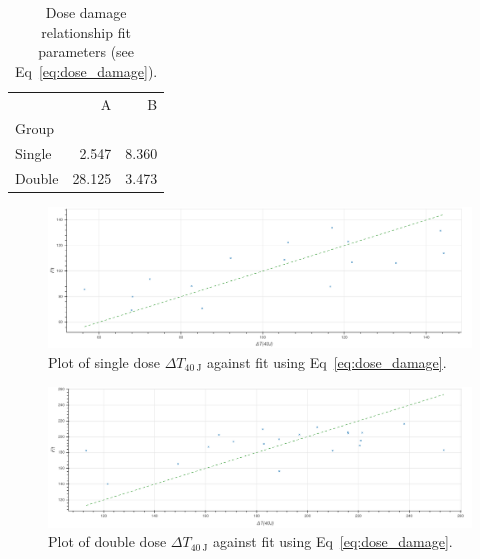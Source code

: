 \documentclass{article}
\begin{document}
    \begin{table}
    \centering
    \caption{Dose damage relationship fit parameters (see Eq~\ref{eq:dose_damage}).}
    \label{table:fit_params_dose}
    
    \begin{tabular}{lrr}
        \toprule
        {} &      A &     B \\
        Group  &        &       \\
        \midrule
        Single &  2.547 & 8.360 \\
        Double & 28.125 & 3.473 \\
        \bottomrule
        \end{tabular}
    \end{table}
\begin{figure}[t]
\caption{Plot of single dose $\Delta T_{\SI{40}{\joule}}$ against fit using Eq~\ref{eq:dose_damage}.}
\label{fig:single_dose}
\includegraphics[width=\textwidth]{plots/single_dose.png}
\centering
\end{figure}

\begin{figure}[t]
\caption{Plot of double dose $\Delta T_{\SI{40}{\joule}}$ against fit using Eq~\ref{eq:dose_damage}.}
\label{fig:double_dose}
\includegraphics[width=\textwidth]{plots/double_dose.png}
\centering
\end{figure}
        
    
\end{document}
